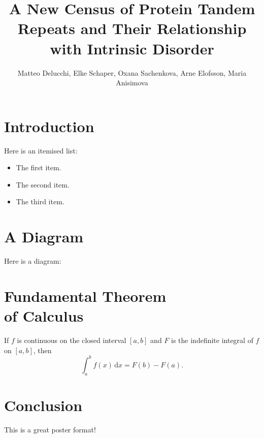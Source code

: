 \documentclass[a0paper,fleqn]{betterposter}
\begin{document}
{{\begin{minipage}[t]{\textwidth}
\end{minipage}

}

}{

\title{A New Census of Protein Tandem Repeats and Their Relationship with Intrinsic Disorder}
\author{Matteo Delucchi, Elke Schaper, Oxana Sachenkova, Arne Elofsson, Maria Anisimova}

\section{Introduction}
Here is an itemised list:
\begin{itemize}
\item The first item.
\item The second item.
\item The third item.
\end{itemize}

\section{A Diagram}
Here is a diagram:
\begin{center}
\end{center}

\section{Fundamental Theorem\\of Calculus}
If $f$ is continuous on the closed interval $[a,b]$ and $F$ is the indefinite integral of $f$ on $[a,b]$, then
\begin{equation}
\int_a^b f(x)\,\mathrm{d}x = F(b)-F(a).
\end{equation}

\section{Conclusion}
This is a great poster format!

}
\end{document}
